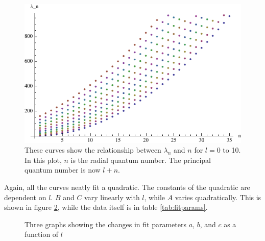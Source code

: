 \documentclass[12pt,twoside]{reedthesis}
\begin{document}
\begin{figure}[h]
\centering
\includegraphics{Figures/allthelcs}
\caption[Plots of $\lambda_n$ versus $n$ for $l = 0$ to $10$]{These curves show the relationship between $\lambda_n$ and $n$ for $l = 0$ to 10. In this plot, $n$ is the radial quantum number. The principal quantum number is now $l + n$.}
\label{fig:allthelcs}
\end{figure}

Again, all the curves neatly fit a quadratic. The constants of the quadratic are dependent on $l$. $B$ and $C$ vary linearly with $l$, while $A$ varies quadratically. This is shown in figure \ref{fig:parameters}, while the data itself is in table \ref{tab:fitparams}.

\begin{figure}[h]
\centering {}
\caption[Fit parameters for $l = 0$ to 10]{Three graphs showing the changes in fit parameters $a$, $b$, and $c$ as a function of $l$}
\label{fig:parameters}
\end{figure}
\end{document}
